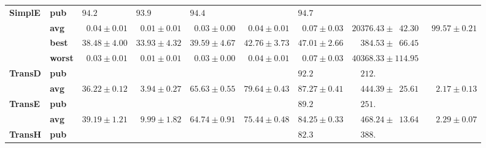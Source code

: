\begin{tabular}{llrrrrrrr}
\textbf{SimplE} & \textbf{pub} &  $94.2\phantom{0 \pm 0.00}$ &  $93.9\phantom{0 \pm 0.00}$ &  $94.4\phantom{0 \pm 0.00}$ &                             &  $94.7\phantom{0 \pm 0.00}$ &                                            &                              \\
       & \textbf{avg} &  $\phantom{0}0.04 \pm 0.01$ &  $\phantom{0}0.01 \pm 0.01$ &  $\phantom{0}0.03 \pm 0.00$ &  $\phantom{0}0.04 \pm 0.01$ &  $\phantom{0}0.07 \pm 0.03$ &            $20376.43 \pm \phantom{0}42.30$ &  $\phantom{0}99.57 \pm 0.21$ \\
       & \textbf{best} &            $38.48 \pm 4.00$ &            $33.93 \pm 4.32$ &            $39.59 \pm 4.67$ &            $42.76 \pm 3.73$ &            $47.01 \pm 2.66$ &  $\phantom{00}384.53 \pm \phantom{0}66.45$ &                              \\
       & \textbf{worst} &  $\phantom{0}0.03 \pm 0.01$ &  $\phantom{0}0.01 \pm 0.01$ &  $\phantom{0}0.03 \pm 0.00$ &  $\phantom{0}0.04 \pm 0.01$ &  $\phantom{0}0.07 \pm 0.03$ &                      $40368.33 \pm 114.95$ &                              \\\midrule
\textbf{TransD} & \textbf{pub} &                             &                             &                             &                             &  $92.2\phantom{0 \pm 0.00}$ &  $\phantom{00}212.\phantom{00 \pm 000.00}$ &                              \\
       & \textbf{avg} &            $36.22 \pm 0.12$ &  $\phantom{0}3.94 \pm 0.27$ &            $65.63 \pm 0.55$ &            $79.64 \pm 0.43$ &            $87.27 \pm 0.41$ &  $\phantom{00}444.39 \pm \phantom{0}25.61$ &  $\phantom{00}2.17 \pm 0.13$ \\\midrule
\textbf{TransE} & \textbf{pub} &                             &                             &                             &                             &  $89.2\phantom{0 \pm 0.00}$ &  $\phantom{00}251.\phantom{00 \pm 000.00}$ &                              \\
       & \textbf{avg} &            $39.19 \pm 1.21$ &  $\phantom{0}9.99 \pm 1.82$ &            $64.74 \pm 0.91$ &            $75.44 \pm 0.48$ &            $84.25 \pm 0.33$ &  $\phantom{00}468.24 \pm \phantom{0}13.64$ &  $\phantom{00}2.29 \pm 0.07$ \\\midrule
\textbf{TransH} & \textbf{pub} &                             &                             &                             &                             &  $82.3\phantom{0 \pm 0.00}$ &  $\phantom{00}388.\phantom{00 \pm 000.00}$ &                              \\

\end{tabular}
